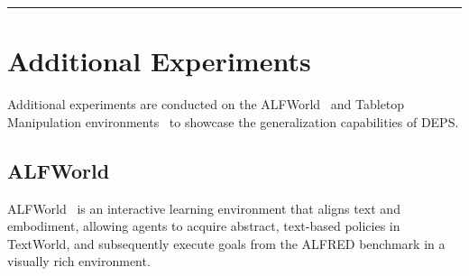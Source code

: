 \documentclass{article}
\newcommand\DoToCc{%
  \startcontents
  \printcontents{}{1}{{\fontsize{14}{14}\selectfont \textbf{Contents}}\vskip3pt\hrule\vskip5pt}
  \vskip3pt\hrule\vskip5pt
}
\begin{document}





\newpage
\appendix
\onecolumn

\section*{}

\DoToCc

\clearpage


\section{Additional Experiments}\label{sec:other_exp}

Additional experiments are conducted on the ALFWorld~\cite{alfworld} and Tabletop Manipulation environments~\cite{clipport} to showcase the generalization capabilities of DEPS.

\subsection{ALFWorld}

ALFWorld~\cite{alfworld} is an interactive learning environment that aligns text and embodiment, allowing agents to acquire abstract, text-based policies in TextWorld, and subsequently execute goals from the ALFRED benchmark in a visually rich environment.
\end{document}
